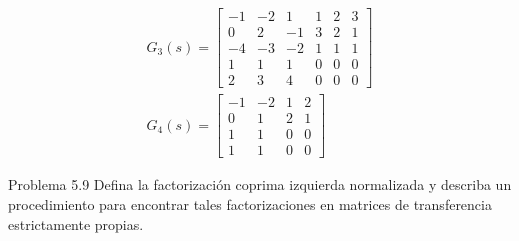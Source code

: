 $$
\begin{gathered}
G_{3}(s)=\left[\begin{array}{ccc|ccc}
-1 & -2 & 1 & 1 & 2 & 3 \\
0 & 2 & -1 & 3 & 2 & 1 \\
-4 & -3 & -2 & 1 & 1 & 1 \\
\hline 1 & 1 & 1 & 0 & 0 & 0 \\
2 & 3 & 4 & 0 & 0 & 0
\end{array}\right] \\
G_{4}(s)=\left[\begin{array}{cc|cc}
-1 & -2 & 1 & 2 \\
0 & 1 & 2 & 1 \\
\hline 1 & 1 & 0 & 0 \\
1 & 1 & 0 & 0
\end{array}\right]
\end{gathered}
$$

Problema 5.9 Defina la factorización coprima izquierda normalizada y describa un procedimiento para encontrar tales factorizaciones en matrices de transferencia estrictamente propias.

